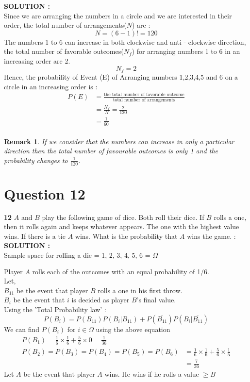 \documentclass{article}
\newtheorem*{remark}{Remark}
\begin{document}
\hspace{1em} \large{\textbf{SOLUTION :}} \\
Since we are arranging the numbers in a circle and we are interested in their order, the total number of arrangements($N$) are :
$$ N = (6-1)! = 120$$
The numbers 1 to 6 can increase in both clockwise and anti - clockwise direction, the total number of favorable outcomes($N_f$) for arranging numbers 1 to 6 in an increasing order are 2.
$$ N_f  = 2 $$
Hence, the probability of Event (E) of Arranging numbers 1,2,3,4,5 and 6 on a circle in an increasing order is :
\begin{align*}
	P(E) &= \frac{\text{the total number of favorable outcome}}{\text{total number of arrangements}} \\
	&= \frac{N_f}{N} = \frac{2}{120} \\
	&= \frac{1}{60} \\
\end{align*}
\begin{remark}
If we consider that the numbers can increase in only a particular direction then the total number of favourable outcomes is only 1 and the probability changes to $\frac{1}{120}$.
\end{remark}
\section{Question 12}
\label{Q12}
\textbf{12} $A$ and $B$ play the following game of dice. Both roll their dice. If $B$ rolls a one, then it rolls again and keeps whatever appears. The one with the highest value wins. If there is a tie $A$ wins. What is the probability that $A$ wins the game. : \\

\hspace{1em} \large{\textbf{SOLUTION :}} \\
    Sample space for rolling a die = {1, 2, 3, 4, 5, 6} = $\Omega$
    
    Player $A$ rolls each of the outcomes with an equal probability of 1/6.\\
    Let,\\
    $B_{11}$ be the event that player $B$ rolls a one in his first throw.\\
    $B_i$ be the event that $i$ is decided as player $B$'s final value.\\
    
    Using the 'Total Probability law' :
\begin{equation*}
    P(B_i) = P(B_{11})P(B_i|B_{11}) + P(\overline{B_{11}})P(B_i|\overline{B_{11}})
\end{equation*}
We can find $P(B_i)$ for $i\in \Omega$ using the above equation
\begin{align*}
    P(B_1)=\frac{1}{6}\times\frac{1}{6}+\frac{5}{6}\times0=\frac{1}{36}\\
    P(B_2)=P(B_3)=P(B_4)=P(B_5)=P(B_6)&=\frac{1}{6}\times\frac{1}{6}+\frac{5}{6}\times\frac{1}{5}\\
    &=\frac{7}{36}
\end{align*}
Let $A$ be the event that player $A$ wins. He wins if he rolls a value $\geq B$
\end{document}
